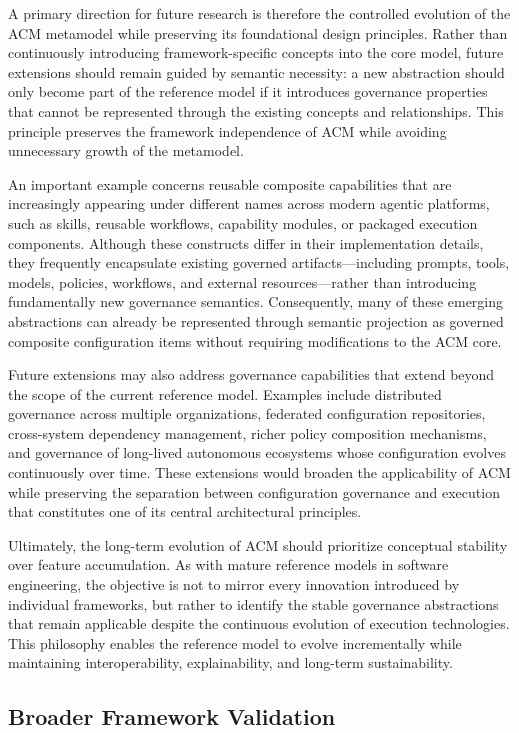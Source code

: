 \documentclass[10pt]{article}
\begin{document}
A primary direction for future research is therefore the controlled evolution of the ACM metamodel while preserving its foundational design principles. Rather than continuously introducing framework-specific concepts into the core model, future extensions should remain guided by semantic necessity: a new abstraction should only become part of the reference model if it introduces governance properties that cannot be represented through the existing concepts and relationships. This principle preserves the framework independence of ACM while avoiding unnecessary growth of the metamodel.

An important example concerns reusable composite capabilities that are increasingly appearing under different names across modern agentic platforms, such as skills, reusable workflows, capability modules, or packaged execution components. Although these constructs differ in their implementation details, they frequently encapsulate existing governed artifacts—including prompts, tools, models, policies, workflows, and external resources—rather than introducing fundamentally new governance semantics. Consequently, many of these emerging abstractions can already be represented through semantic projection as governed composite configuration items without requiring modifications to the ACM core.

Future extensions may also address governance capabilities that extend beyond the scope of the current reference model. Examples include distributed governance across multiple organizations, federated configuration repositories, cross-system dependency management, richer policy composition mechanisms, and governance of long-lived autonomous ecosystems whose configuration evolves continuously over time. These extensions would broaden the applicability of ACM while preserving the separation between configuration governance and execution that constitutes one of its central architectural principles.

Ultimately, the long-term evolution of ACM should prioritize conceptual stability over feature accumulation. As with mature reference models in software engineering, the objective is not to mirror every innovation introduced by individual frameworks, but rather to identify the stable governance abstractions that remain applicable despite the continuous evolution of execution technologies. This philosophy enables the reference model to evolve incrementally while maintaining interoperability, explainability, and long-term sustainability.

\subsection{Broader Framework Validation}
\label{sec:future_framework_validation}
\end{document}
